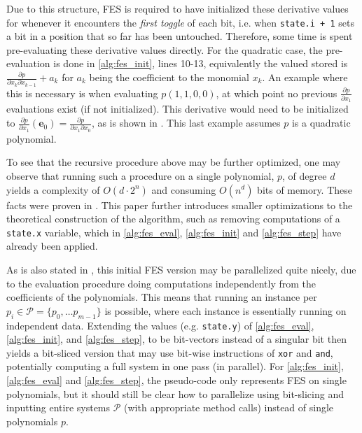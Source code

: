Due to this structure, FES is required to have initialized these derivative values for whenever it encounters the \textit{first toggle} of each bit, i.e. when \texttt{state.i + 1} sets a bit in a position that so far has been untouched. Therefore, some time is spent pre-evaluating these derivative values directly. For the quadratic case, the pre-evaluation is done in \cref{alg:fes_init}, lines 10-13, equivalently the valued stored is $\frac{\partial p}{\partial x_k \partial x_{k-1}} + a_k$ for $a_k$ being the coefficient to the monomial $x_k$. An example where this is necessary is when evaluating $p(1,1,0,0)$, at which point no previous $\frac{\partial p}{\partial x_1}$ evaluations exist (if not initialized). This derivative would need to be initialized to $\frac{\partial p}{\partial x_1}(\mathbf{e}_0) = \frac{\partial p}{\partial x_1 \partial x_0}$, as is shown in \cite{tungchoumasters}. This last example assumes $p$ is a quadratic polynomial.

To see that the recursive procedure above may be further optimized, one may observe that running such a procedure on a single polynomial, $p$, of degree $d$ yields a complexity of $O(d\cdot2^n)$ and consuming $O(n^d)$ bits of memory. These facts were proven in \cite{ches-2010-23990}. This paper further introduces smaller optimizations to the theoretical construction of the algorithm, such as removing computations of a \texttt{state.x} variable, which in \cref{alg:fes_eval}, \ref{alg:fes_init} and \ref{alg:fes_step} have already been applied. 

As is also stated in \cite{ches-2010-23990}, this initial FES version may be parallelized quite nicely, due to the evaluation procedure doing computations independently from the coefficients of the polynomials. This means that running an instance per $p_i \in \mathcal{P} = \{p_0, \dots p_{m-1}\}$ is possible, where each instance is essentially running on independent data. Extending the values (e.g. \texttt{state.y}) of \cref{alg:fes_eval}, \ref{alg:fes_init}, and \ref{alg:fes_step}, to be bit-vectors instead of a singular bit then yields a bit-sliced version that may use bit-wise instructions of \texttt{xor} and \texttt{and}, potentially computing a full system in one pass (in parallel). For \cref{alg:fes_init}, \cref{alg:fes_eval} and \cref{alg:fes_step}, the pseudo-code only represents FES on single polynomials, but it should still be clear how to parallelize using bit-slicing and inputting entire systems $\mathcal{P}$ (with appropriate method calls) instead of single polynomials $p$. 

